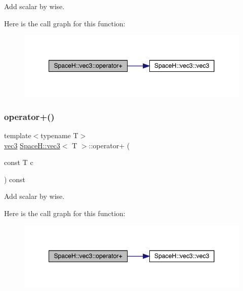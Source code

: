 Add scalar by wise. 

Here is the call graph for this function\+:
\nopagebreak
\begin{figure}[H]
\begin{center}
\leavevmode
\includegraphics[width=348pt]{struct_space_h_1_1vec3_a9271a40ff2a3d64a97f37e53fb668d07_cgraph}
\end{center}
\end{figure}
\mbox{\label{struct_space_h_1_1vec3_a9271a40ff2a3d64a97f37e53fb668d07}} 
\subsubsection{\texorpdfstring{operator+()}{operator+()}\hspace{0.1cm}{\footnotesize\ttfamily [6/7]}}
{\footnotesize\ttfamily template$<$typename T$>$ \\
\mbox{\hyperlink{struct_space_h_1_1vec3}{vec3}} \mbox{\hyperlink{struct_space_h_1_1vec3}{Space\+H\+::vec3}}$<$ T $>$\+::operator+ (\begin{DoxyParamCaption}\item[{const T}]{c }\end{DoxyParamCaption}) const\hspace{0.3cm}{\ttfamily [inline]}}



Add scalar by wise. 

Here is the call graph for this function\+:
\nopagebreak
\begin{figure}[H]
\begin{center}
\leavevmode
\includegraphics[width=348pt]{struct_space_h_1_1vec3_a9271a40ff2a3d64a97f37e53fb668d07_cgraph}
\end{center}
\end{figure}
\mbox{\label{struct_space_h_1_1vec3_a9271a40ff2a3d64a97f37e53fb668d07}} 
